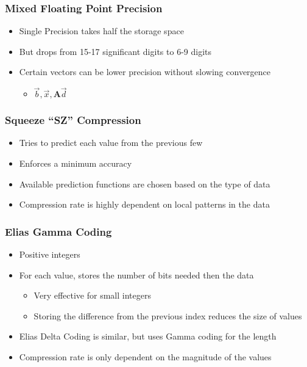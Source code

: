 \documentclass{beamer}
\newcommand{\mat}[1]{\mathbf{#1}}
\begin{document}
\begin{frame}
	\frametitle{Mixed Floating Point Precision}
	\begin{itemize}
		\item Single Precision takes half the storage space
		\item But drops from 15-17 significant digits to 6-9 digits
		\item Certain vectors can be lower precision without slowing convergence
		\begin{itemize}
			\item \(\vec{b}, \vec{x}, \mat{A}\vec{d}\)
		\end{itemize}
	\end{itemize}
\end{frame}

\begin{frame}
	\frametitle{Squeeze ``SZ'' Compression}
	\begin{itemize}
		\item Tries to predict each value from the previous few
		\item Enforces a minimum accuracy
		\pause
		\item Available prediction functions are chosen based on the type of data
		\pause
		\item Compression rate is highly dependent on local patterns in the data
	\end{itemize}
\end{frame}

\begin{frame}
	\frametitle{Elias Gamma Coding}
	\begin{itemize}
		\item Positive integers
		\item For each value, stores the number of bits needed then the data
		\begin{itemize}
			\item Very effective for small integers
			\item Storing the difference from the previous index reduces the size of values
		\end{itemize}
		\pause
		\item Elias Delta Coding is similar, but uses Gamma coding for the length
		\pause
		\item Compression rate is only dependent on the magnitude of the values
	\end{itemize}
\end{frame}
\end{document}

